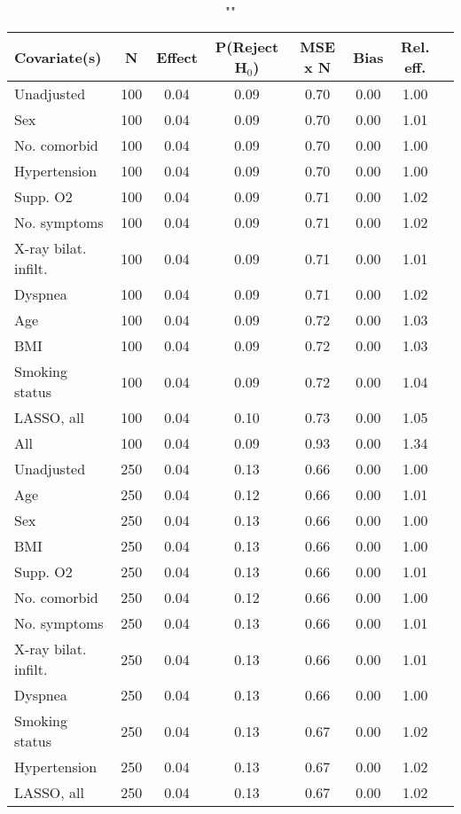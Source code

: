 \documentclass{article}
\begin{document}
{\tabcolsep=6pt  %
\begin{longtable}{lccccccc}
\caption{""} \\
Covariate(s) & N & Effect & P(Reject H$_0$) & MSE x N & Bias & Rel. eff.\\ \midrule
Unadjusted & 100 & 0.04 & 0.09 & 0.70 & 0.00 & 1.00 \\ 
Sex & 100 & 0.04 & 0.09 & 0.70 & 0.00 & 1.01 \\ 
No. comorbid & 100 & 0.04 & 0.09 & 0.70 & 0.00 & 1.00 \\ 
Hypertension & 100 & 0.04 & 0.09 & 0.70 & 0.00 & 1.00 \\ 
Supp. O2 & 100 & 0.04 & 0.09 & 0.71 & 0.00 & 1.02 \\ 
No. symptoms & 100 & 0.04 & 0.09 & 0.71 & 0.00 & 1.02 \\ 
X-ray bilat. infilt. & 100 & 0.04 & 0.09 & 0.71 & 0.00 & 1.01 \\ 
Dyspnea & 100 & 0.04 & 0.09 & 0.71 & 0.00 & 1.02 \\ 
Age & 100 & 0.04 & 0.09 & 0.72 & 0.00 & 1.03 \\ 
BMI & 100 & 0.04 & 0.09 & 0.72 & 0.00 & 1.03 \\ 
Smoking status & 100 & 0.04 & 0.09 & 0.72 & 0.00 & 1.04 \\ 
LASSO, all & 100 & 0.04 & 0.10 & 0.73 & 0.00 & 1.05 \\ 
All & 100 & 0.04 & 0.09 & 0.93 & 0.00 & 1.34 \\ \midrule 
Unadjusted & 250 & 0.04 & 0.13 & 0.66 & 0.00 & 1.00 \\ 
Age & 250 & 0.04 & 0.12 & 0.66 & 0.00 & 1.01 \\ 
Sex & 250 & 0.04 & 0.13 & 0.66 & 0.00 & 1.00 \\ 
BMI & 250 & 0.04 & 0.13 & 0.66 & 0.00 & 1.00 \\ 
Supp. O2 & 250 & 0.04 & 0.13 & 0.66 & 0.00 & 1.01 \\ 
No. comorbid & 250 & 0.04 & 0.12 & 0.66 & 0.00 & 1.00 \\ 
No. symptoms & 250 & 0.04 & 0.13 & 0.66 & 0.00 & 1.01 \\ 
X-ray bilat. infilt. & 250 & 0.04 & 0.13 & 0.66 & 0.00 & 1.01 \\ 
Dyspnea & 250 & 0.04 & 0.13 & 0.66 & 0.00 & 1.00 \\ 
Smoking status & 250 & 0.04 & 0.13 & 0.67 & 0.00 & 1.02 \\ 
Hypertension & 250 & 0.04 & 0.13 & 0.67 & 0.00 & 1.02 \\ 
LASSO, all & 250 & 0.04 & 0.13 & 0.67 & 0.00 & 1.02 \\ 

\end{longtable}}
\end{document}
